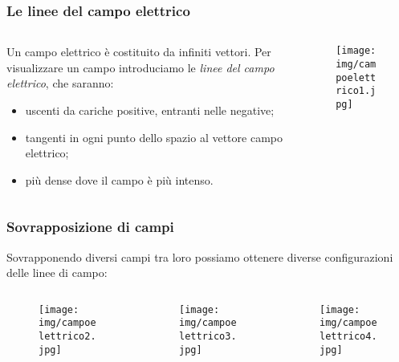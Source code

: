 \documentclass[]{beamer}
\theoremstyle{plain}
\begin{document}
\begin{frame}
\frametitle{Le linee del campo elettrico}

\begin{columns}
\begin{column}{0.6\textwidth}
Un campo elettrico è costituito da infiniti vettori. Per visualizzare un campo introduciamo le \emph{linee del campo elettrico}, che saranno:
\begin{itemize}
  \item uscenti da cariche positive, entranti nelle negative;
  \item tangenti in ogni punto dello spazio al vettore campo elettrico;
  \item più dense dove il campo è più intenso.
\end{itemize}
\end{column}
\begin{column}{0.3\textwidth}
\begin{figure}
\texttt{[image: img/campoelettrico1.jpg]}
\end{figure}
\end{column}
\end{columns}
\end{frame}






\begin{frame}
\frametitle{Sovrapposizione di campi}
Sovrapponendo diversi campi tra loro possiamo ottenere diverse configurazioni delle linee di campo:
\begin{columns}
\begin{column}{0.3\textwidth}
\begin{figure}
\texttt{[image: img/campoelettrico2.jpg]}
\end{figure}
\end{column}
\begin{column}{0.3\textwidth}
\begin{figure}
\texttt{[image: img/campoelettrico3.jpg]}
\end{figure}
\end{column}
\begin{column}{0.3\textwidth}
\begin{figure}
\texttt{[image: img/campoelettrico4.jpg]}
\end{figure}
\end{column}
\end{columns}
\end{frame}
\end{document}
